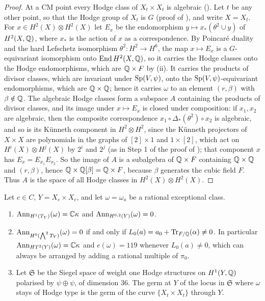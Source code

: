 \begin{proof}
At a CM point every Hodge class of $X_{t}\times X_{t}$ is algebraic
(). Let $t$ be any other point, so that the Hodge group
of $X_{t}$ is $G$ (proof of ), and write $X=X_{t}$.
For $x\in H^{2}(X)\otimes H^{2}(X)$ let $E_{x}$ be the endomorphism $y\mapsto x_{*}(\theta^{2}\cup y)$ of $H^{2}(X,\mathbb{Q})$, where
$x_{*}$ is the action of $x$ as a correspondence. By Poincar\'e duality and
the hard Lefschetz isomorphism $\theta^{2}\colon H^{2}\to H^{6}$, the map
$x\mapsto E_{x}$ is a $G$-equivariant isomorphism onto $\operatorname{End} H^{2}(X,\mathbb{Q})$,
so it carries the Hodge classes onto the Hodge endomorphisms, which are
$\mathbb{Q}\times F$ by (ii). It carries the products of
divisor classes, which are invariant under $\operatorname{Sp}(V,\psi)$, onto the
$\operatorname{Sp}(V,\psi)$-equivariant endomorphisms, which are $\mathbb{Q}\times\mathbb{Q}$; hence it
carries $\omega$ to an element $(r,\beta)$ with $\beta\notin\mathbb{Q}$. The
algebraic Hodge classes form a subspace $A$ containing the products of divisor
classes, and its image under $x\mapsto E_{x}$ is closed under composition:
if $x_{1},x_{2}$ are algebraic, then the composite correspondence $x_{1}\circ\Delta_{*}(\theta^{2})\circ
x_{2}$ is algebraic, and so is its K\"unneth component in
$H^{2}\otimes H^{2}$, since the K\"unneth projectors of $X\times X$ are
polynomials in the graphs of $[2]\times1$ and $1\times[2]$, which act on
$H^{i}(X)\otimes H^{j}(X)$ by $2^{i}$ and $2^{j}$ (as in Step 1 of the proof
of ); that component $x$ has
$E_{x}=E_{x_{1}}E_{x_{2}}$. So the image of $A$ is a subalgebra of
$\mathbb{Q}\times F$ containing $\mathbb{Q}\times\mathbb{Q}$ and $(r,\beta)$, hence
$\mathbb{Q}\times\mathbb{Q}[\beta]=\mathbb{Q}\times F$, because $\beta$ generates the cubic
field $F$. Thus $A$ is the space of all Hodge classes in
$H^{2}(X)\otimes H^{2}(X)$.
\end{proof}

\begin{theorem}\label{thm:mumfordrigid}
Let $c\in C$, $Y=X_{c}\times X_{c}$, and let $\omega=\omega_{a}$ be a
rational exceptional class.
\begin{enumerate}[label=\textup{(\roman*)},leftmargin=2.6em,itemsep=2pt]
\item $\operatorname{Ann}_{H^{1}(T_{Y})}(\omega)=\mathbb{C}\kappa$ and
  $\operatorname{Ann}_{H^{0,2}(Y)}(\omega)=0$.
\item $\operatorname{Ann}_{H^{0}(\bigwedge^{2}T_{Y})}(\omega)=0$ if and only if
  $L_{0}(a)=a_{0}+\operatorname{Tr}_{F/\mathbb{Q}}(\alpha)\ne0$. In particular
  $\operatorname{Ann}_{HT^{2}(Y)}(\omega)=\mathbb{C}\kappa$ and $e(\omega)=119$ whenever
  $L_{0}(a)\ne0$, which can always be arranged by adding a rational multiple
  of $\pi_{0}$.
\item Let $\mathfrak{S}$ be the Siegel space of weight one Hodge structures on
  $H^{1}(Y,\mathbb{Q})$ polarised by $\psi\oplus\psi$, of dimension $36$. The germ at
  $Y$ of the locus in $\mathfrak{S}$ where $\omega$ stays of Hodge type is the
  germ of the curve $\{X_{t}\times X_{t}\}$ through $Y$.
\end{enumerate}
\end{theorem}

